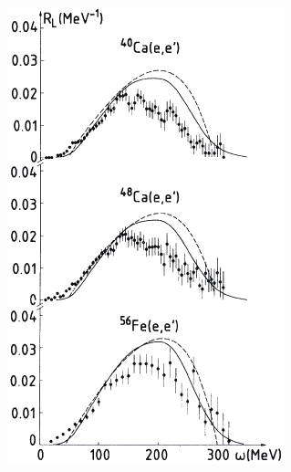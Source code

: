 \begin{figure}
\begin{subfigure}{.7\textwidth}
\centering
\includegraphics[width=.8\linewidth]{figs/R_L_q_550.png}
\label{fig:R_L_q_550}
\end{subfigure}%
\begin{subfigure}{.5\textwidth}
\centering

\end{subfigure}
\end{figure}

